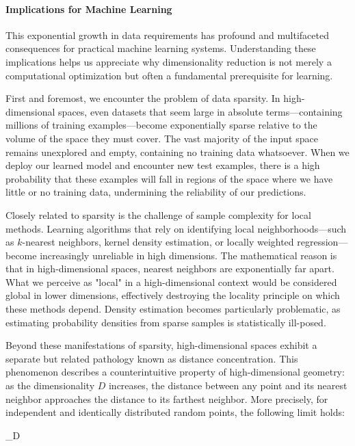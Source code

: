 \paragraph{Implications for Machine Learning}

This exponential growth in data requirements has profound and multifaceted consequences for practical machine learning systems. Understanding these implications helps us appreciate why dimensionality reduction is not merely a computational optimization but often a fundamental prerequisite for learning.

First and foremost, we encounter the problem of data sparsity. In high-dimensional spaces, even datasets that seem large in absolute terms—containing millions of training examples—become exponentially sparse relative to the volume of the space they must cover. The vast majority of the input space remains unexplored and empty, containing no training data whatsoever. When we deploy our learned model and encounter new test examples, there is a high probability that these examples will fall in regions of the space where we have little or no training data, undermining the reliability of our predictions.

Closely related to sparsity is the challenge of sample complexity for local methods. Learning algorithms that rely on identifying local neighborhoods—such as $k$-nearest neighbors, kernel density estimation, or locally weighted regression—become increasingly unreliable in high dimensions. The mathematical reason is that in high-dimensional spaces, nearest neighbors are exponentially far apart. What we perceive as "local" in a high-dimensional context would be considered global in lower dimensions, effectively destroying the locality principle on which these methods depend. Density estimation becomes particularly problematic, as estimating probability densities from sparse samples is statistically ill-posed.

Beyond these manifestations of sparsity, high-dimensional spaces exhibit a separate but related pathology known as distance concentration. This phenomenon describes a counterintuitive property of high-dimensional geometry: as the dimensionality $D$ increases, the distance between any point and its nearest neighbor approaches the distance to its farthest neighbor. More precisely, for independent and identically distributed random points, the following limit holds:
\begin{myequation}
\lim_{D \to \infty}  
\end{myequation}

